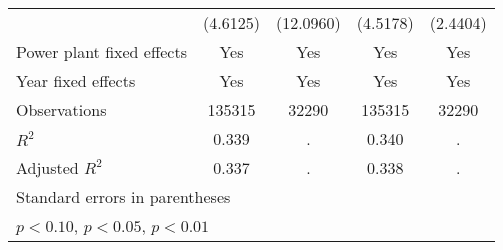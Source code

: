 {\begin{tabular}{l*{4}{c}}
                    &    (4.6125)         &   (12.0960)         &    (4.5178)         &    (2.4404)         \\
\addlinespace
Power plant fixed effects&         Yes         &         Yes         &         Yes         &         Yes         \\
\addlinespace
Year fixed effects  &         Yes         &         Yes         &         Yes         &         Yes         \\
\midrule
Observations        &      135315         &       32290         &      135315         &       32290         \\
\(R^{2}\)           &       0.339         &           .         &       0.340         &           .         \\
Adjusted \(R^{2}\)  &       0.337         &           .         &       0.338         &           .         \\
\bottomrule
\multicolumn{5}{l}{\footnotesize Standard errors in parentheses}\\
\multicolumn{5}{l}{\footnotesize \sym{*} \(p<0.10\), \sym{**} \(p<0.05\), \sym{***} \(p<0.01\)}\\
\end{tabular}
}
